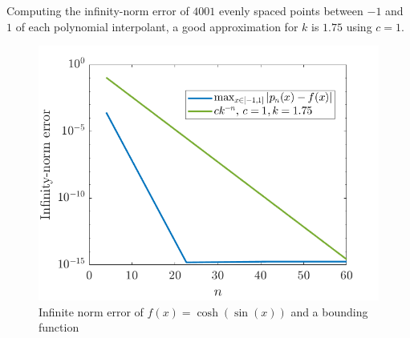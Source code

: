 \begin{solution}
  Computing the infinity-norm error of $4001$ evenly spaced points between $-1$ and $1$
  of each polynomial interpolant, a good approximation for $k$ is $1.75$ using $c = 1$.
  
  \begin{figure}[H]
    \centering
    \includegraphics[scale=0.5]{graphics/plot-05-03.png}
    \caption{Infinite norm error of $f(x) = \cosh(\sin(x))$ and a bounding function}
  \end{figure}
\end{solution}